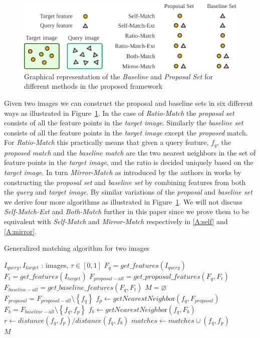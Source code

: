 \documentclass[review]{elsarticle}
\begin{document}
\begin{figure}[t]
\centering
\includegraphics[width=0.95\columnwidth]{images/overview-wide}
\caption{Graphical representation of the \emph{Baseline} and 
\emph{Proposal Set} for different methods in the proposed framework}
\label{fig:overview}
\end{figure}

Given two images we can construct the proposal and baseline sets in six different ways as illustrated in Figure~\ref{fig:overview}. In the case of \emph{Ratio-Match} \cite{lowe2004sift} the \emph{proposal set} consists of all the feature points in the \emph{target image}.  Similarly the \emph{baseline set} consists of all the feature points in the \emph{target image} except the \emph{proposed} match. For \emph{Ratio-Match} this practically means that given a query feature, $f_q$, the \emph{proposed match} and the \emph{baseline match} are the two nearest neighbors in the set of feature points in the \emph{target image}, and the ratio is decided uniquely based on the \emph{target image}. In turn \emph{Mirror-Match} as introduced by the authors in \cite{arnfred2013mirror} works by constructing the \emph{proposal set} and \emph{baseline set} by combining features from both the \emph{query} and \emph{target image}. By similar variations of the \emph{proposal} and \emph{baseline set} we derive four more algorithms as illustrated in Figure~\ref{fig:overview}. We will not discuss \emph{Self-Match-Ext} and \emph{Both-Match} further in this paper since we prove them to be equivalent with \emph{Self-Match} and \emph{Mirror-Match} respectively in \ref{A:self} and \ref{A:mirror}.

\begin{algorithm}[htb]
\caption{Generalized matching algorithm for two images}
\label{alg-gen}
\begin{algorithmic}
    \Require $I_{query}, I_{target}$ : images, $\tau \in [0,1]$
    \State $F_{q} = get\_features(I_{query})$
    \State $F_{t} = get\_features(I_{target})$
\State $F_{proposal-all} = get\_proposal\_features(F_{q}, 
F_{t})$
\State $F_{baseline-all} = get\_baseline\_features(F_{q}, 
F_{t})$
\State $M = \varnothing$
    \State $F_{proposal} = F_{proposal-all} \setminus 
    \left\{f_q\right\}$
    \State $f_p \gets getNearestNeighbo\text{r}(f_q, F_{proposal})$
    \State $F_{b} = F_{baseline-all} \setminus \left\{f_q, 
    f_p\right\}$
    \State $f_b \gets getNearestNeighbo\text{r}(f_q, F_{b})$
    \State $r \gets distance(f_q, f_p) / distance(f_q, f_b)$
        \State $matches \gets matches \cup \left(f_q, f_p\right)$
	\EndIf
\EndFor \\
\Return $M$
\end{algorithmic}
\end{algorithm}
\end{document}
